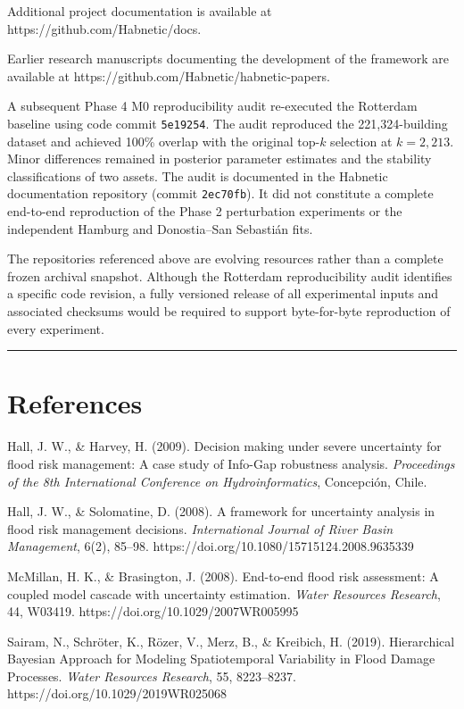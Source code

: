 \documentclass[
]{article}
\begin{document}
Additional project documentation is available at
https://github.com/Habnetic/docs.

Earlier research manuscripts documenting the development of the
framework are available at https://github.com/Habnetic/habnetic-papers.

A subsequent Phase 4 M0 reproducibility audit re-executed the Rotterdam
baseline using code commit \texttt{5e19254}. The audit reproduced the
221,324-building dataset and achieved 100\% overlap with the original
top-\(k\) selection at \(k=2{,}213\). Minor differences remained in
posterior parameter estimates and the stability classifications of two
assets. The audit is documented in the Habnetic documentation repository
(commit \texttt{2ec70fb}). It did not constitute a complete end-to-end
reproduction of the Phase 2 perturbation experiments or the independent
Hamburg and Donostia--San Sebastián fits.

The repositories referenced above are evolving resources rather than a
complete frozen archival snapshot. Although the Rotterdam
reproducibility audit identifies a specific code revision, a fully
versioned release of all experimental inputs and associated checksums
would be required to support byte-for-byte reproduction of every
experiment.

\begin{center}\rule{0.5\linewidth}{0.5pt}\end{center}

\section{References}\label{references}

Hall, J. W., \& Harvey, H. (2009). Decision making under severe
uncertainty for flood risk management: A case study of Info-Gap
robustness analysis. \emph{Proceedings of the 8th International
Conference on Hydroinformatics}, Concepción, Chile.

Hall, J. W., \& Solomatine, D. (2008). A framework for uncertainty
analysis in flood risk management decisions. \emph{International Journal
of River Basin Management}, 6(2), 85--98.
https://doi.org/10.1080/15715124.2008.9635339

McMillan, H. K., \& Brasington, J. (2008). End-to-end flood risk
assessment: A coupled model cascade with uncertainty estimation.
\emph{Water Resources Research}, 44, W03419.
https://doi.org/10.1029/2007WR005995

Sairam, N., Schröter, K., Rözer, V., Merz, B., \& Kreibich, H. (2019).
Hierarchical Bayesian Approach for Modeling Spatiotemporal Variability
in Flood Damage Processes. \emph{Water Resources Research}, 55,
8223--8237. https://doi.org/10.1029/2019WR025068
\end{document}
